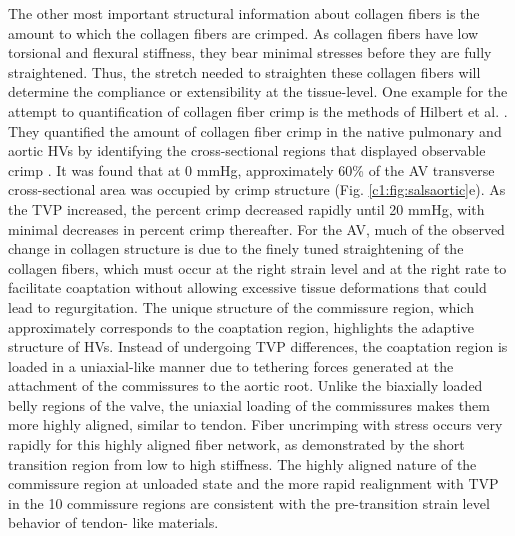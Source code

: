     
    The other most important structural information about collagen fibers is the amount to which the collagen fibers are crimped. As collagen fibers have low torsional and flexural stiffness, they bear minimal stresses before they are fully straightened. Thus, the stretch needed to straighten these collagen fibers will determine the compliance or extensibility at the tissue-level. One example for the attempt to quantification of collagen fiber crimp is the methods of Hilbert et al. \cite{hilbert_optical_1986, hilbert_porcine_1990}. They quantified the amount of collagen fiber crimp in the native pulmonary and aortic HVs by identifying the cross-sectional regions that displayed observable crimp \cite{joyce_functional_2009}. It was found that at 0 mmHg, approximately 60\% of the AV transverse cross-sectional area was occupied by crimp structure (Fig. \ref{c1:fig:salsaortic}e). As the TVP increased, the percent crimp decreased rapidly until 20 mmHg, with minimal decreases in percent crimp thereafter. For the AV, much of the observed change in collagen structure is due to the finely tuned straightening of the collagen fibers, which must occur at the right strain level and at the right rate to facilitate coaptation without allowing excessive tissue deformations that could lead to regurgitation. The unique structure of the commissure region, which approximately corresponds to the coaptation region, highlights the adaptive structure of HVs. Instead of undergoing TVP differences, the coaptation region is loaded in a uniaxial-like manner due to tethering forces generated at the attachment of the commissures to the aortic root. Unlike the biaxially loaded belly regions of the valve, the uniaxial loading of the commissures makes them more highly aligned, similar to tendon. Fiber uncrimping with stress occurs very rapidly for this highly aligned fiber network, as demonstrated by the short transition region from low to high stiffness. The highly aligned nature of the commissure region at unloaded state and the more rapid realignment with TVP in the 10 commissure regions are consistent with the pre-transition strain level behavior of tendon- like materials. 